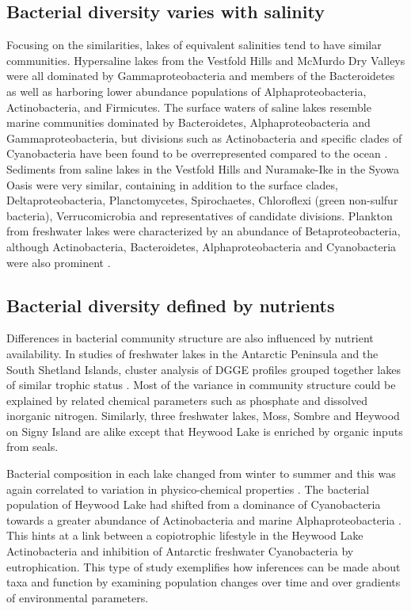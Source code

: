 \subsection{Bacterial diversity varies with salinity}
Focusing on the similarities, lakes of equivalent salinities tend to have similar communities.
Hypersaline lakes from the Vestfold Hills \cite{Bowman2000b} and McMurdo Dry Valleys \cite{Glatz2006, Mosier2007} were all dominated by Gammaproteobacteria and members of the Bacteroidetes
 as well as harboring lower abundance populations of Alphaproteobacteria, Actinobacteria, and Firmicutes.
The surface waters of saline lakes resemble marine communities dominated by Bacteroidetes, Alphaproteobacteria and Gammaproteobacteria,
 but divisions such as Actinobacteria and specific clades of Cyanobacteria have been found to be overrepresented compared to the ocean \cite{Lauro2011}.
Sediments from saline lakes in the Vestfold Hills \cite{Bowman2000a} and Nuramake-Ike in the Syowa Oasis \cite{Kurasawa2010} were very similar, 
containing in addition to the surface clades, Deltaproteobacteria, Planctomycetes, Spirochaetes, Chloroflexi (green non-sulfur bacteria), Verrucomicrobia and representatives of candidate divisions.
Plankton from freshwater lakes were characterized by an abundance of Betaproteobacteria, 
although Actinobacteria, Bacteroidetes, Alphaproteobacteria and Cyanobacteria were also prominent \cite{Pearce2003, Pearce2005, Pearce2005, Schiaffino2009}. 

\subsection{Bacterial diversity defined by nutrients}
Differences in bacterial community structure are also influenced by nutrient availability.
In studies of freshwater lakes in the Antarctic Peninsula and the South Shetland Islands, cluster analysis of DGGE profiles grouped together lakes of similar trophic status 
\cite{Schiaffino2009, Villaescusa2010}.
Most of the variance in community structure could be explained by related chemical parameters such as phosphate and dissolved inorganic nitrogen.
Similarly, three freshwater lakes, Moss, Sombre and Heywood on Signy Island are alike except that Heywood Lake is enriched by organic inputs from seals.

Bacterial composition in each lake changed from winter to summer and this was again correlated to variation in physico-chemical properties \cite{Pearce2005}. 
The bacterial population of Heywood Lake had shifted from a dominance of Cyanobacteria towards a greater abundance of Actinobacteria and marine Alphaproteobacteria \cite{Pearce2005}.
This hints at a link between a copiotrophic lifestyle in the Heywood Lake Actinobacteria and inhibition of Antarctic freshwater Cyanobacteria by eutrophication. 
This type of study exemplifies how inferences can be made about taxa and function by examining population changes over time and over gradients of environmental parameters.


